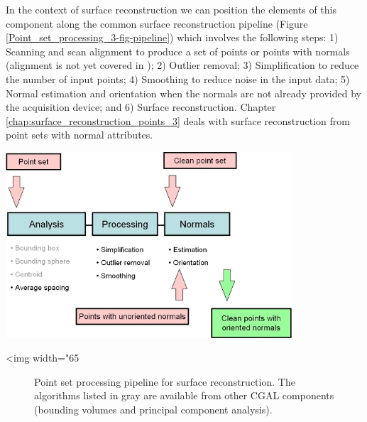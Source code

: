 In the context of surface reconstruction we can position the elements of this component along the common surface reconstruction pipeline (Figure \ref{Point_set_processing_3-fig-pipeline}) which involves the following steps: 1) Scanning and scan alignment to produce a set of points or points with normals (alignment is not yet covered in \cgal); 2) Outlier removal; 3) Simplification to reduce the number of input points; 4) Smoothing to reduce noise in the input data; 5) Normal estimation and orientation when the normals are not already provided by the acquisition device; and 6) Surface reconstruction. Chapter  \ref{chap:surface_reconstruction_points_3} deals with surface reconstruction from point sets with normal attributes.

\begin{center}
    \label{Point_set_processing_3-fig-pipeline}
    \begin{ccTexOnly}
        \includegraphics[width=0.8\textwidth]{Point_set_processing_3/pipeline} %
    \end{ccTexOnly}
    \begin{ccHtmlOnly}
        <img width="65%
    \end{ccHtmlOnly}
    \begin{figure}[h]
        \caption{Point set processing pipeline for surface reconstruction.
                 The algorithms listed in gray are available from other
                 CGAL components (bounding volumes and principal
                 component analysis).}
    \end{figure}
\end{center}


